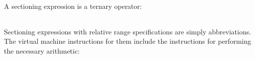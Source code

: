 A sectioning expression is a ternary operator:

\begin{center}
\tabletail{}
\tablelasttail{}
\begin{supertabular}{|m{1.9073598in}|m{2.75596in}|}

\end{supertabular}
\end{center}

Sectioning expressions with relative range specifications are simply
abbreviations. The virtual machine instructions for them include the
instructions for performing the necessary arithmetic:

\begin{center}
\tabletail{}
\tablelasttail{}
\begin{supertabular}{|m{1.9073598in}|m{2.75596in}|}

\end{supertabular}
\end{center}

